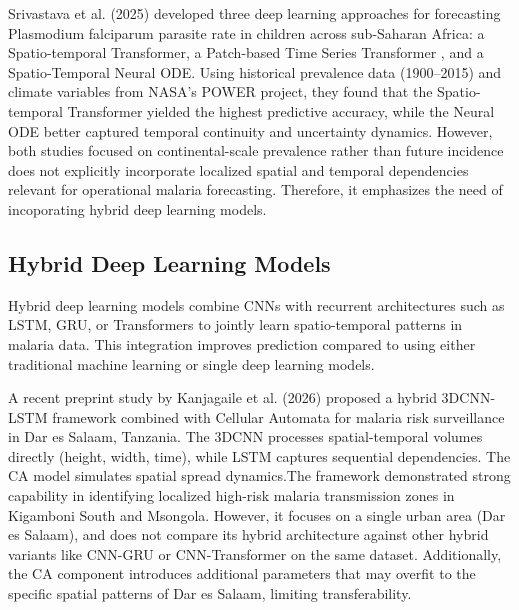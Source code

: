 Srivastava et al. (2025)\cite{Srivastava2025} developed three deep learning approaches for forecasting Plasmodium falciparum parasite rate in children across sub-Saharan Africa: a Spatio-temporal Transformer, a Patch-based Time Series Transformer , and a Spatio-Temporal Neural ODE. Using historical prevalence data (1900--2015) and climate variables from NASA's POWER project, they found that the Spatio-temporal Transformer yielded the highest predictive accuracy, while the Neural ODE better captured temporal continuity and uncertainty dynamics. However, both studies  focused on continental-scale prevalence  rather than  future incidence does not explicitly incorporate localized spatial and temporal dependencies relevant for operational malaria forecasting. Therefore, it emphasizes the need of  incoporating hybrid deep learning models. 

\subsection{Hybrid Deep Learning Models}

Hybrid deep learning models combine CNNs with recurrent architectures such as LSTM, GRU, or Transformers to jointly learn spatio-temporal patterns in malaria data. This integration improves prediction compared to using either traditional machine learning or single deep learning models.

A recent preprint study by Kanjagaile et al. (2026) proposed a hybrid 3DCNN-LSTM framework combined with Cellular Automata for malaria risk surveillance in Dar es Salaam, Tanzania. The 3DCNN processes spatial-temporal volumes directly (height, width, time), while LSTM captures sequential dependencies. The CA model simulates spatial spread dynamics.The framework demonstrated strong capability in identifying localized high-risk malaria transmission zones in Kigamboni South and Msongola. However, it  focuses on a single urban area (Dar es Salaam), and does not compare its hybrid architecture against other hybrid variants like CNN-GRU or CNN-Transformer on the same dataset. Additionally, the CA component introduces additional parameters that may overfit to the specific spatial patterns of Dar es Salaam, limiting transferability.

